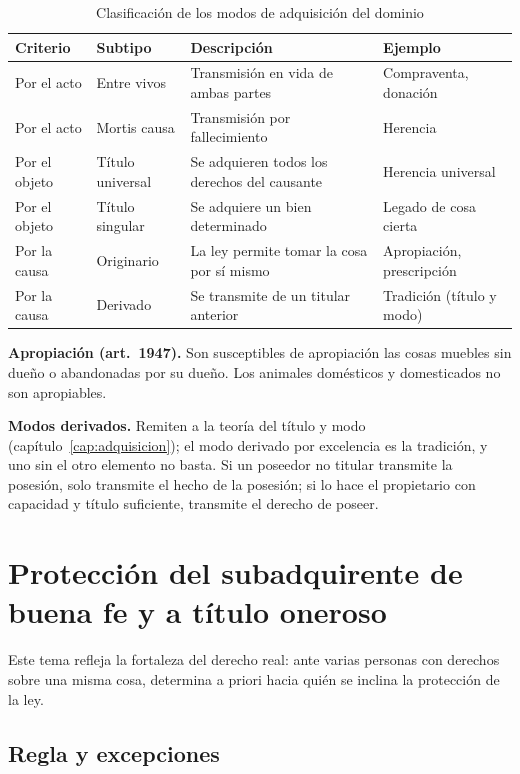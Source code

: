 \documentclass[12pt,oneside]{book}
\begin{document}
\begin{table}[H]
\centering
\small
\begin{tabularx}{\textwidth}{>{\raggedright\arraybackslash}p{}>{\raggedright\arraybackslash}p{}>{\raggedright\arraybackslash}X>{\raggedright\arraybackslash}p{}}
\toprule
\textbf{Criterio} & \textbf{Subtipo} & \textbf{Descripción} & \textbf{Ejemplo} \\
\midrule
Por el acto & Entre vivos & Transmisión en vida de ambas partes & Compraventa, donación \\
Por el acto & Mortis causa & Transmisión por fallecimiento & Herencia \\
Por el objeto & Título universal & Se adquieren todos los derechos del causante & Herencia universal \\
Por el objeto & Título singular & Se adquiere un bien determinado & Legado de cosa cierta \\
Por la causa & Originario & La ley permite tomar la cosa por sí mismo & Apropiación, prescripción \\
Por la causa & Derivado & Se transmite de un titular anterior & Tradición (título y modo) \\
\bottomrule
\end{tabularx}
\caption{Clasificación de los modos de adquisición del dominio}
\end{table}

\textbf{Apropiación (art.~1947).} Son susceptibles de apropiación las cosas muebles sin dueño o abandonadas por su dueño. Los animales domésticos y domesticados no son apropiables.

\textbf{Modos derivados.} Remiten a la teoría del título y modo (capítulo~\ref{cap:adquisicion}); el modo derivado por excelencia es la tradición, y uno sin el otro elemento no basta. Si un poseedor no titular transmite la posesión, solo transmite el hecho de la posesión; si lo hace el propietario con capacidad y título suficiente, transmite el derecho de poseer.

\section{Protección del subadquirente de buena fe y a título oneroso}

Este tema refleja la fortaleza del derecho real: ante varias personas con derechos sobre una misma cosa, determina a priori hacia quién se inclina la protección de la ley.

\subsection{Regla y excepciones}
\end{document}
